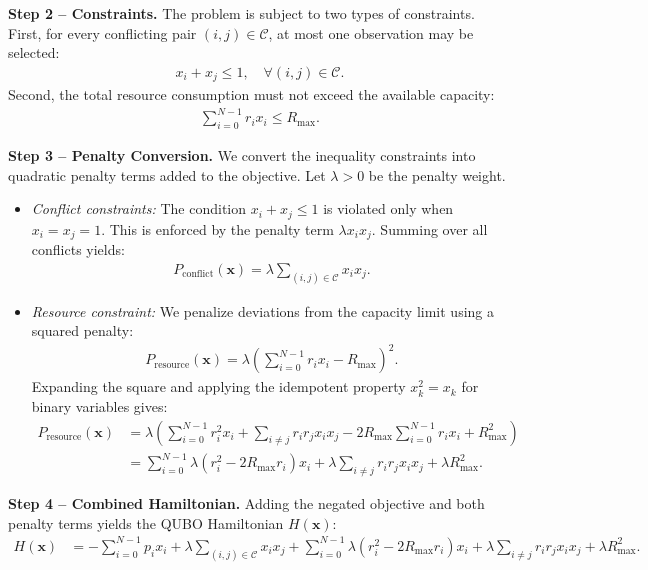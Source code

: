 \documentclass[12pt]{article}
\begin{document}
\textbf{Step 2 -- Constraints.} The problem is subject to two types of constraints. First, for every conflicting pair $(i,j) \in \mathcal{C}$, at most one observation may be selected:
\begin{align}
    x_i + x_j \leq 1, \quad \forall (i,j) \in \mathcal{C}.
\end{align}
Second, the total resource consumption must not exceed the available capacity:
\begin{align}
    \sum_{i=0}^{N-1} r_i x_i \leq R_{\max}.
\end{align}

\textbf{Step 3 -- Penalty Conversion.} We convert the inequality constraints into quadratic penalty terms added to the objective. Let $\lambda > 0$ be the penalty weight.
\begin{itemize}
    \item \textit{Conflict constraints:} The condition $x_i + x_j \leq 1$ is violated only when $x_i = x_j = 1$. This is enforced by the penalty term $\lambda x_i x_j$. Summing over all conflicts yields:
    \begin{align}
        P_{\text{conflict}}(\mathbf{x}) = \lambda \sum_{(i,j) \in \mathcal{C}} x_i x_j.
    \end{align}
    \item \textit{Resource constraint:} We penalize deviations from the capacity limit using a squared penalty:
    \begin{align}
        P_{\text{resource}}(\mathbf{x}) = \lambda \left( \sum_{i=0}^{N-1} r_i x_i - R_{\max} \right)^2.
    \end{align}
    Expanding the square and applying the idempotent property $x_k^2 = x_k$ for binary variables gives:
    \begin{align}
        P_{\text{resource}}(\mathbf{x}) &= \lambda \left( \sum_{i=0}^{N-1} r_i^2 x_i + \sum_{i \neq j} r_i r_j x_i x_j - 2 R_{\max} \sum_{i=0}^{N-1} r_i x_i + R_{\max}^2 \right) \nonumber \\
        &= \sum_{i=0}^{N-1} \lambda (r_i^2 - 2 R_{\max} r_i) x_i + \lambda \sum_{i \neq j} r_i r_j x_i x_j + \lambda R_{\max}^2.
    \end{align}
\end{itemize}

\textbf{Step 4 -- Combined Hamiltonian.} Adding the negated objective and both penalty terms yields the QUBO Hamiltonian $H(\mathbf{x})$:
\begin{align}
    H(\mathbf{x}) &= -\sum_{i=0}^{N-1} p_i x_i + \lambda \sum_{(i,j) \in \mathcal{C}} x_i x_j + \sum_{i=0}^{N-1} \lambda (r_i^2 - 2 R_{\max} r_i) x_i + \lambda \sum_{i \neq j} r_i r_j x_i x_j + \lambda R_{\max}^2.
\end{align}
\end{document}
